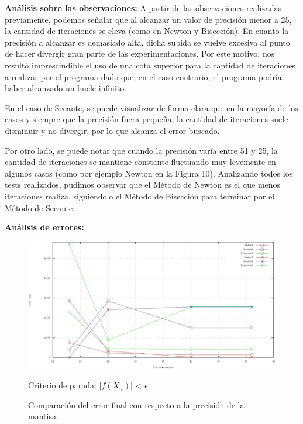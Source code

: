 \documentclass[10pt, a4paper]{article}
\begin{document}
 
\large{\textbf{An\'alisis sobre las observaciones:}}\newline
A partir de las observaciones realizadas previamente, podemos señalar que al alcanzar un valor de precisi\'on menor a 25, la cantidad de iteraciones se eleva (como en Newton y Bisecci\'on). En cuanto la precisi\'on a alcanzar es demasiado alta, dicha subida se vuelve excesiva al punto de hacer divergir gran parte de las experimentaciones. Por este motivo, nos result\'o imprescindible el uso de una cota superior para la cantidad de iteraciones a realizar por el programa dado que, en el caso contrario, el programa podr\'ia haber alcanzado un bucle infinito.\newline

En el caso de Secante, se puede visualizar de forma clara que en la mayor\'ia de los casos y siempre que la precisi\'on fuera pequeña, la cantidad de iteraciones suele disminuir y no divergir, por lo que alcanza el error buscado.

Por otro lado, se puede notar que cuando la precisión varía entre 51 y 25, la cantidad de iteraciones se mantiene constante fluctuando muy levemente en algunos casos (como por ejemplo Newton en la Figura 10). Analizando todos los tests realizados, pudimos observar que el M\'etodo de Newton es el que menos iteraciones realiza, sigui\'endolo el M\'etodo de Bisecci\'on para terminar por el M\'etodo de Secante.\newline

\large{\textbf{An\'alisis de errores:}}
\begin{figure}[H] %
\begin{center}
\includegraphics[width=370pt]{./error1.jpg}
\caption[h]{Comparaci\'on del error final con respecto a la precisi\'on de la mantisa.}{Criterio de parada: $|f(X_{n})|$ < $\epsilon$}
\end{center}
\end{figure}
\end{document}

